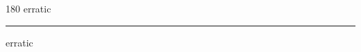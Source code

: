 
\begin{frame}
\begin{center}
\begin{turn}{180}
{\fontsize{2.5cm}{1em}\selectfont erratic}
\end{turn}
\vspace{1em}\par  
\hrule
\vspace{1em}\par  
{\fontsize{2.5cm}{1em}\selectfont erratic}
\end{center}
\end{frame}

